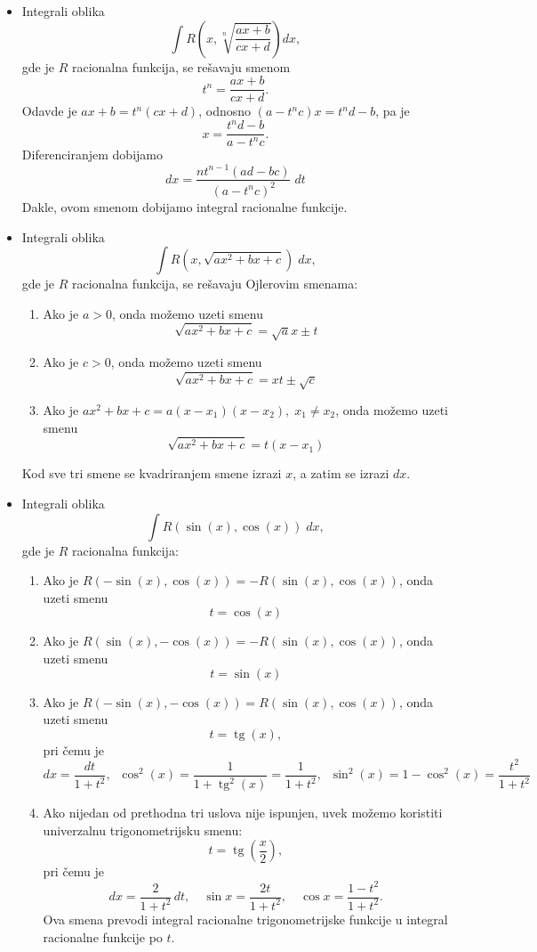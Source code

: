 \documentclass[a4paper,12pt,twoside]{report}
\numberwithin{algorithm}{section}
\renewcommand{\tan}{\operatorname{tg}}
\begin{document}
\begin{itemize}
    \item Integrali oblika \[ \int R\left(x, \sqrt[n]{\frac{ax + b}{cx + d}}\right)dx, \] gde je $R$ racionalna funkcija, se rešavaju smenom 
    \[ t^n = \frac{ax + b}{cx + d}. \]
    Odavde je $ax + b = t^n(cx + d)$, odnosno $(a - t^nc)x = t^nd-b$, pa je \[ x = \frac{t^nd-b}{a - t^nc}. \] Diferenciranjem 
    dobijamo \[ dx = \frac{nt^{n-1}(ad - bc)}{(a-t^nc)^2} \;dt \] Dakle, ovom smenom dobijamo integral racionalne 
    funkcije.
    \item Integrali oblika \[ \int R(x, \sqrt{ax^2 + bx + c})\;dx,  \] gde je $R$ racionalna funkcija, se rešavaju Ojlerovim smenama:
    \begin{enumerate}
        \item Ako je $a > 0$, onda možemo uzeti smenu 
        \[ \sqrt{ax^2 + bx + c} = \sqrt{a}x \pm t \]
        \item Ako je $c>0$, onda možemo uzeti smenu
        \[ \sqrt{ax^2 + bx + c} = xt \pm \sqrt{c} \]
        \item Ako je $ax^2 + bx + c = a(x-x_1)(x-x_2), \;x_1 \neq x_2$, onda možemo uzeti smenu 
        \[ \sqrt{ax^2 + bx + c} = t(x-x_1) \]
    \end{enumerate}
    Kod sve tri smene se kvadriranjem smene izrazi $x$, a zatim se izrazi $dx$.
    \item Integrali oblika \[ \int R(\sin (x), \cos (x))\;dx, \] gde je $R$ racionalna funkcija:
    \begin{enumerate}
        \item Ako je $R(-\sin(x), \cos(x)) = - R(\sin(x), \cos(x))$, onda uzeti smenu \[ t = \cos(x) \]
        \item Ako je $R(\sin(x), -\cos(x)) = - R(\sin(x), \cos(x))$, onda uzeti smenu \[ t = \sin(x) \]
        \item Ako je $R(-\sin(x), -\cos(x)) = R(\sin(x), \cos(x))$, onda uzeti smenu \[ t = \tan(x), \]
        pri čemu je \[ dx = \frac{dt}{1+t^2}, \;\; \cos^2(x) = \frac{1}{1+\tan^2(x)}=\frac{1}{1 + t^2}, \;\; \sin^2(x) = 1-\cos^2(x) = \frac{t^2}{1+t^2} \]
        \item Ako nijedan od prethodna tri uslova nije ispunjen, uvek možemo koristiti univerzalnu trigonometrijsku smenu:
        \[ t = \tan\left(\frac{x}{2}\right), \]
        pri čemu je
        \[ dx = \frac{2}{1+t^2} \, dt, \quad \sin x = \frac{2t}{1+t^2}, \quad \cos x = \frac{1-t^2}{1+t^2}. \]
        Ova smena prevodi integral racionalne trigonometrijske funkcije u integral racionalne funkcije po $t$.
    \end{enumerate}
\end{itemize}
\end{document}
